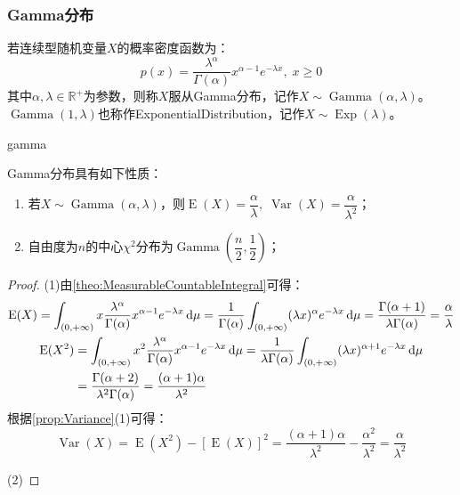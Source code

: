 \subsubsection{Gamma分布}
\begin{definition}
	若连续型随机变量$X$的概率密度函数为：
	\begin{equation*}
		p(x)=\frac{\lambda^\alpha}{\Gamma(\alpha)}x^{\alpha-1}e^{-\lambda x},\;x\geqslant0
	\end{equation*}
	其中$\alpha,\lambda\in\mathbb{R}^{+}$为参数，则称$X$服从Gamma分布，记作$X\sim\operatorname{Gamma}(\alpha,\lambda)$。$\operatorname{Gamma}(1,\lambda)$也称作\gls{ExponentialDistribution}，记作$X\sim\operatorname{Exp}(\lambda)$。
\end{definition}
\begin{densityplot}{gamma}
	\caption{Gamma分布 $\operatorname{Gamma}(3,1)$ 的概率密度函数，其中 $\lambda$ 为率参数}
\end{densityplot}
\begin{property}
	Gamma分布具有如下性质：
	\begin{enumerate}
		\item 若$X\sim\operatorname{Gamma}(\alpha,\lambda)$，则$\operatorname{E}(X)=\dfrac{\alpha}{\lambda},\;\operatorname{Var}(X)=\dfrac{\alpha}{\lambda^2}$；
		\item 自由度为$n$的中心$\chi^2$分布为$\operatorname{Gamma}\left(\dfrac{n}{2},\dfrac{1}{2}\right)$；
	\end{enumerate}
\end{property}
\begin{proof}
	(1)由\cref{theo:MeasurableCountableIntegral}可得：
	\begin{gather*}
		\operatorname{E}(X)=\int_{(0,+\infty)}x\frac{\lambda^\alpha}{\Gamma(\alpha)}x^{\alpha-1}e^{-\lambda x}\mathop{}\!\mathrm{d}\mu=\frac{1}{\Gamma(\alpha)}\int_{(0,+\infty)}(\lambda x)^{\alpha}e^{-\lambda x}\mathop{}\!\mathrm{d}\mu=\frac{\Gamma(\alpha+1)}{\lambda\Gamma(\alpha)}=\frac{\alpha}{\lambda} \\
		\begin{aligned}
			\operatorname{E}(X^2)&=\int_{(0,+\infty)}x^2\frac{\lambda^\alpha}{\Gamma(\alpha)}x^{\alpha-1}e^{-\lambda x}\mathop{}\!\mathrm{d}\mu=\frac{1}{\lambda\Gamma(\alpha)}\int_{(0,+\infty)}(\lambda x)^{\alpha+1}e^{-\lambda x}\mathop{}\!\mathrm{d}\mu \\
			&=\frac{\Gamma(\alpha+2)}{\lambda^2\Gamma(\alpha)}=\frac{(\alpha+1)\alpha}{\lambda^2}
		\end{aligned}
	\end{gather*}
	根据\cref{prop:Variance}(1)可得：
	\begin{equation*}
		\operatorname{Var}(X)=\operatorname{E}(X^2)-[\operatorname{E}(X)]^2=\frac{(\alpha+1)\alpha}{\lambda^2}-\frac{\alpha^2}{\lambda^2}=\frac{\alpha}{\lambda^2}
	\end{equation*}\par
	(2)
\end{proof}
